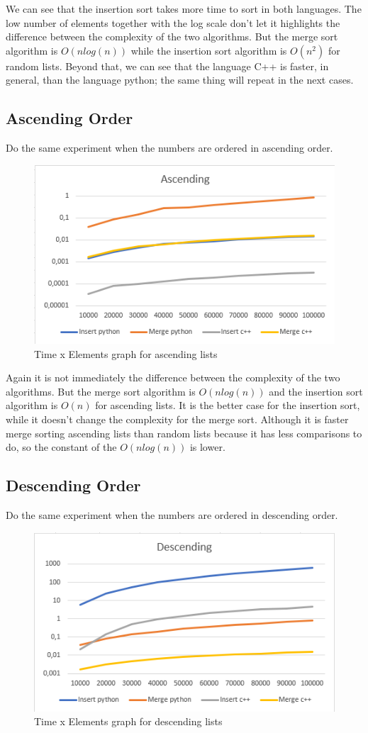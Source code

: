 \documentclass{article}
\begin{document}
We can see that the insertion sort takes more time to sort in both languages. The low number of elements together with the log scale don't let it highlights the difference between the complexity of the two algorithms. But the merge sort algorithm is $O(n log(n))$ while the insertion sort algorithm is $O(n^2)$ for random lists. Beyond that, we can see that the language C++ is faster, in general, than the language python; the same thing will repeat in the next cases.


\subsection{Ascending Order}
Do the same experiment when the numbers are ordered in ascending order.


\begin{figure}[H]
  \centering
  \includegraphics[width=0.7\linewidth]{Ascending.PNG}
  \caption{Time x Elements graph for ascending lists}
  \label{fig:boat1}
\end{figure}

Again it is not immediately the difference between the complexity of the two algorithms. But the merge sort algorithm is $O(n log(n))$ and the insertion sort algorithm is $O(n)$ for ascending lists. It is the better case for the insertion sort, while it doesn't change the complexity for the merge sort. Although it is faster merge sorting ascending lists than random lists because it has less comparisons to do, so the constant of the $O(n log(n))$ is lower.


\subsection{Descending Order}
Do the same experiment when the numbers are ordered in descending order.


\begin{figure}[H]
  \centering
  \includegraphics[width=0.7\linewidth]{Descending.PNG}
  \caption{Time x Elements graph for descending lists}
  \label{fig:boat1}
\end{figure}
\end{document}
